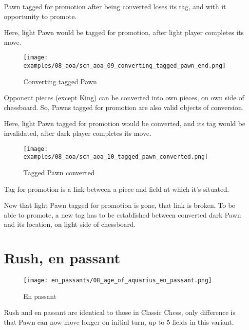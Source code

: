 Pawn tagged for promotion after being converted loses its tag, and with it opportunity to promote.

Here, light Pawn would be tagged for promotion, after light player completes its move.

\clearpage %

\noindent
\begin{figure}[h]
\texttt{[image: examples/08\_aoa/scn\_aoa\_09\_converting\_tagged\_pawn\_end.png]}
\caption{Converting tagged Pawn}
\label{fig:scn_aoa_09_converting_tagged_pawn_end}
\end{figure}

Opponent pieces (except King) can be \hyperref[sec:Mayan Ascendancy/Pyramid/Conversion]{converted into own pieces}, on own side of chessboard.
So, Pawns tagged for promotion are also valid objects of conversion.

Here, light Pawn tagged for promotion would be converted, and its tag would be invalidated, after dark player completes its move.

\clearpage %

\noindent
\begin{figure}[h]
\texttt{[image: examples/08\_aoa/scn\_aoa\_10\_tagged\_pawn\_converted.png]}
\caption{Tagged Pawn converted}
\label{fig:scn_aoa_10_tagged_pawn_converted}
\end{figure}

Tag for promotion is a link between a piece and field at which it's situated.

Now that light Pawn tagged for promotion is gone, that link is broken.
To be able to promote, a new tag has to be established between converted dark Pawn and its location, on light side of chessboard.

\clearpage %

\section*{Rush, en passant}
\label{sec:Age of Aquarius/Rush, en passant}

\noindent
\begin{wrapfigure}{l}{0.4\textwidth}
\centering
\texttt{[image: en\_passants/08\_age\_of\_aquarius\_en\_passant.png]}
\caption{En passant}
\label{fig:08_age_of_aquarius_en_passant}
\end{wrapfigure}
Rush and en passant are identical to those in Classic Chess, only difference
is that Pawn can now move longer on initial turn, up to 5 fields in this
variant.

